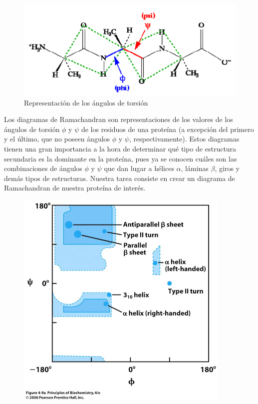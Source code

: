 \documentclass[12pt]{article}
\begin{document}
\begin{figure}[H]
\centering
\includegraphics[scale=0.6]{unnamed}
\caption{Representación de los ángulos de torsión}
\end{figure}


Los diagramas de Ramachandran son representaciones de los valores de los ángulos de torsión $\phi$ y $\psi$ de los residuos de una proteína (a excepción del primero y el último, que no poseen ángulos $\phi$ y $\psi$, respectivamente). Estos diagramas tienen una gran importancia a la hora de determinar qué tipo de estructura secundaria es la dominante en la proteína, pues ya se conocen cuáles son las combinaciones de ángulos $\phi$ y $\psi$ que dan lugar a hélices $\alpha$, láminas $\beta$, giros y demás tipos de estructuras. Nuestra tarea consiste en crear un diagrama de Ramachandran de nuestra proteína de interés.
\newline

\begin{figure}[H]
\centering
\includegraphics[trim={0 1cm 0 0},clip,scale=0.6]{figurenew}
\end{figure}
\end{document}
